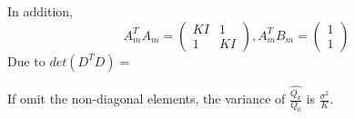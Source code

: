 In addition,
\begin{equation}
    A_m^TA_m=\begin{pmatrix}
        KI&1\\
        1&KI
    \end{pmatrix},
    A_m^TB_m=\begin{pmatrix}
        1\\
        1
    \end{pmatrix}
\end{equation}
Due to $det(D^TD)=$

If omit the non-diagonal elements, the variance of $\hat{\frac{Q_k}{Q_0}}$ is $\frac{\sigma^2}{K}$.